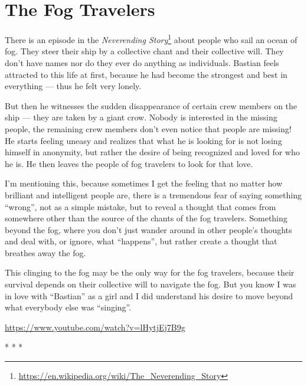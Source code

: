 \section{The Fog Travelers}

There is an episode in the \textit{Neverending Story}\footnote{\url{https://en.wikipedia.org/wiki/The\_Neverending\_Story}} about people who sail an ocean of fog. They steer their ship by a collective chant and their collective will. They don't have names nor do they ever do anything as individuals. Bastian feels attracted to this life at first, because he had become the strongest and best in everything --- thus he felt very lonely.

But then he witnesses the sudden disappearance of certain crew members on the ship --- they are taken by a giant crow. Nobody is interested in the missing people, the remaining crew members don't even notice that people are missing! He starts feeling uneasy and realizes that what he is looking for is not losing himself in anonymity, but rather the desire of being recognized and loved for who he is. He then leaves the people of fog travelers to look for that love.

I'm mentioning this, because sometimes I get the feeling that no matter how brilliant and intelligent people are, there is a tremendous fear of saying something ``wrong'', not as a simple mistake, but to reveal a thought that comes from somewhere other than the source of the chants of the fog travelers. Something beyond the fog, where you don't just wander around in other people's thoughts and deal with, or ignore, what ``happens'', but rather create a thought that breathes away the fog.

This clinging to the fog may be the only way for the fog travelers, because their survival depends on their collective will to navigate the fog. But you know I was in love with ``Bastian'' as a girl and I did understand his desire to move beyond what everybody else was ``singing''.

\url{https://www.youtube.com/watch?v=lHytjEj7B9g}


\begin{center}* * *\end{center}

